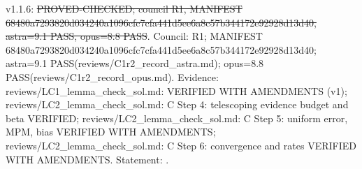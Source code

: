 \begin{theorem}\label{reg:W3-SAMP_C}
\end{theorem}
\begin{statusbox}
 v1.1.6: \st{PROVED-CHECKED; council R1, MANIFEST 68480a7293820d034240a1096cfc7cfa441d5ee6a8c57b344172e92928d13d40, astra=9.1 PASS, opus=8.8 PASS}. Council: R1; MANIFEST 68480a7293820d034240a1096cfc7cfa441d5ee6a8c57b344172e92928d13d40; astra=9.1 PASS(reviews/C1r2\_record\_astra.md); opus=8.8 PASS(reviews/C1r2\_record\_opus.md). Evidence: reviews/LC1\_lemma\_check\_sol.md: VERIFIED WITH AMENDMENTS (v1); reviews/LC2\_lemma\_check\_sol.md: C Step 4: telescoping evidence budget and beta VERIFIED; reviews/LC2\_lemma\_check\_sol.md: C Step 5: uniform error, MPM, bias VERIFIED WITH AMENDMENTS; reviews/LC2\_lemma\_check\_sol.md: C Step 6: convergence and rates VERIFIED WITH AMENDMENTS. Statement: .
\end{statusbox}
